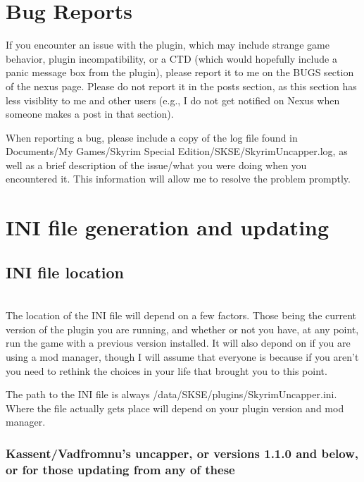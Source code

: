 \documentclass[12pt]{amsart}
\begin{document}
\startblock
\section{Bug Reports}

If you encounter an issue with the plugin, which may include strange game
behavior, plugin incompatibility, or a CTD (which would hopefully include
a panic message box from the plugin), please report it to me on the BUGS
section of the nexus page. Please do not report it in the posts section, as
this section has less visiblity to me and other users (e.g., I do not get
notified on Nexus when someone makes a post in that section).

When reporting a bug, please include a copy of the log file found in
\textlangle Documents\textrangle/My Games/Skyrim Special Edition/SKSE/SkyrimUncapper.log,
as well as a brief description of the issue/what you were doing when you
encountered it. This information will allow me to resolve the problem promptly.
\stopblock

\startblock
\section{INI file generation and updating}

\bigskip
\subsection{INI file location}\hfill\\

The location of the INI file will depend on a few factors. Those being the
current version of the plugin you are running, and whether or not you have,
at any point, run the game with a previous version installed. It will also
depond on if you are using a mod manager, though I will assume that everyone
is because if you aren't you need to rethink the choices in your life that
brought you to this point.

The path to the INI file is always /data/SKSE/plugins/SkyrimUncapper.ini.
Where the file actually gets place will depend on your plugin version and
mod manager.
\stopblock

\startblock
\subsubsection{Kassent/Vadfromnu's uncapper, or versions 1.1.0 and below,
or for those updating from any of these}\hfill\\
\end{document}
